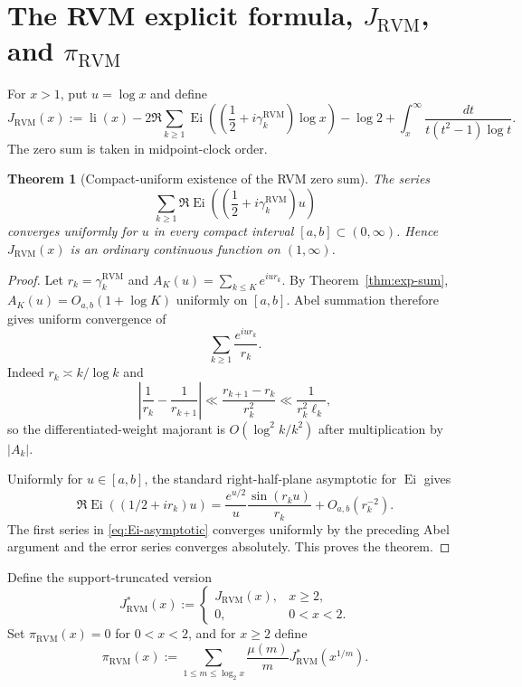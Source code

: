\documentclass[11pt,reqno]{amsart}
\newtheorem{theorem}{Theorem}[section]
\theoremstyle{definition}
\theoremstyle{remark}
\newcommand{\li}{\operatorname{li}}
\newcommand{\Ei}{\operatorname{Ei}}
\newcommand{\RVM}{\mathrm{RVM}}
\begin{document}
\section{The RVM explicit formula, $J_{\RVM}$, and $\pi_{\RVM}$}

For $x>1$, put $u=\log x$ and define
\begin{equation}\label{eq:J-RVM}
 J_{\RVM}(x)
 :=\li(x)
 -2\Re\sum_{k\ge1}\Ei\!\left(\left(\frac12+i\gamma_k^{\RVM}\right)\log x\right)
 -\log2
 +\int_x^\infty\frac{dt}{t(t^2-1)\log t}.
\end{equation}
The zero sum is taken in midpoint-clock order.

\begin{theorem}[Compact-uniform existence of the RVM zero sum]\label{thm:J-exists}
The series
\[
 \sum_{k\ge1}
 \Re\Ei\!\left(\left(\frac12+i\gamma_k^{\RVM}\right)u\right)
\]
converges uniformly for $u$ in every compact interval $[a,b]\subset(0,\infty)$.  Hence $J_{\RVM}(x)$ is an ordinary continuous function on $(1,\infty)$.
\end{theorem}

\begin{proof}
Let $r_k=\gamma_k^{\RVM}$ and
$A_K(u)=\sum_{k\le K}e^{iur_k}$.  By Theorem~\ref{thm:exp-sum},
$A_K(u)=O_{a,b}(1+\log K)$ uniformly on $[a,b]$.  Abel summation therefore gives uniform convergence of
\[
 \sum_{k\ge1}\frac{e^{iur_k}}{r_k}.
\]
Indeed $r_k\asymp k/\log k$ and
\[
 \left|\frac1{r_k}-\frac1{r_{k+1}}\right|
 \ll\frac{r_{k+1}-r_k}{r_k^2}
 \ll\frac1{r_k^2\ell_k},
\]
so the differentiated-weight majorant is $O(\log^2k/k^2)$ after multiplication by $|A_k|$.

Uniformly for $u\in[a,b]$, the standard right-half-plane asymptotic for $\Ei$ gives
\begin{equation}\label{eq:Ei-asymptotic}
 \Re\Ei((1/2+ir_k)u)
 =\frac{e^{u/2}}{u}\frac{\sin(r_ku)}{r_k}
 +O_{a,b}(r_k^{-2}).
\end{equation}
The first series in \eqref{eq:Ei-asymptotic} converges uniformly by the preceding Abel argument and the error series converges absolutely.  This proves the theorem.
\end{proof}

Define the support-truncated version
\begin{equation}\label{eq:J-star}
 J_{\RVM}^{*}(x):=
 \begin{cases}
 J_{\RVM}(x),&x\ge2,\\
 0,&0<x<2.
 \end{cases}
\end{equation}
Set $\pi_{\RVM}(x)=0$ for $0<x<2$, and for $x\ge2$ define
\begin{equation}\label{eq:pi-RVM}
 \boxed{
 \pi_{\RVM}(x)
 :=\sum_{1\le m\le\log_2x}
 \frac{\mu(m)}m J_{\RVM}^{*}(x^{1/m}).}
\end{equation}
\end{document}
